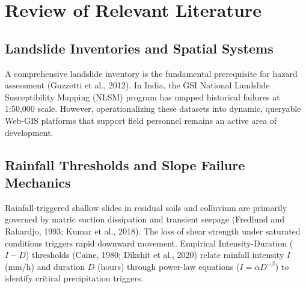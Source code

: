 \documentclass[12pt,a4paper]{report}
\begin{document}
\newpage

\chapter{Review of Relevant Literature}

\section{Landslide Inventories and Spatial Systems}
A comprehensive landslide inventory is the fundamental prerequisite for hazard assessment (Guzzetti et al., 2012). In India, the GSI National Landslide Susceptibility Mapping (NLSM) program has mapped historical failures at 1:50,000 scale. However, operationalizing these datasets into dynamic, queryable Web-GIS platforms that support field personnel remains an active area of development.

\section{Rainfall Thresholds and Slope Failure Mechanics}
Rainfall-triggered shallow slides in residual soils and colluvium are primarily governed by matric suction dissipation and transient seepage (Fredlund and Rahardjo, 1993; Kumar et al., 2018). The loss of shear strength under saturated conditions triggers rapid downward movement. Empirical Intensity-Duration ($I-D$) thresholds (Caine, 1980; Dikshit et al., 2020) relate rainfall intensity $I$ (mm/h) and duration $D$ (hours) through power-law equations ($I = \alpha D^{-\beta}$) to identify critical precipitation triggers.
\end{document}
